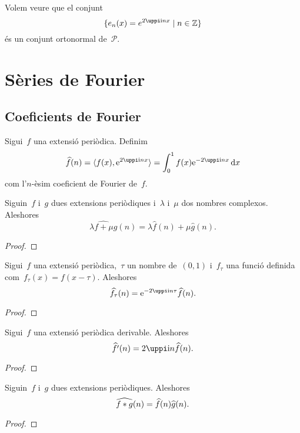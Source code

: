 \documentclass[../../main.tex]{subfiles}
\begin{document}
	\begin{example}
		\label{ex:base ortonormal de les extensions periòdiques}
		Volem veure que el conjunt
		\[
		    \{e_{n}(x)=e^{2\uppi\iu nx}\mid n\in\mathbb{Z}\}
		\]
		és un conjunt ortonormal de~\(\mathcal{P}\).
		\begin{solution}
		\end{solution}
	\end{example}
\section{Sèries de Fourier}
	\subsection{Coeficients de Fourier}
	\begin{definition}
		\label{def:coeficients de Fourier}
		Sigui~\(f\) una extensió periòdica.
		Definim
		\[
		    \widehat{f}(n)=\langle f(x),\e^{2\uppi\iu nx}\rangle=\int_{0}^{1}f(x)\e^{-2\uppi\iu nx}\diff x
		\]
		com l'\(n\)-èsim coeficient de Fourier de~\(f\).
	\end{definition}
	\begin{proposition}
		Siguin~\(f\) i~\(g\) dues extensions periòdiques i~\(\lambda\) i~\(\mu\) dos nombres complexos.
		Aleshores
		\[
		    \widehat{\lambda f+\mu g}(n)=\lambda\widehat{f}(n)+\mu\widehat{g}(n).
		\]
		\begin{proof}
		\end{proof}
	\end{proposition}
	\begin{proposition}
		Sigui~\(f\) una extensió periòdica,~\(\tau\) un nombre de~\((0,1)\) i~\(f_{\tau}\) una funció definida com~\(f_{\tau}(x)=f(x-\tau)\).
		Aleshores
		\[
		    \widehat{f_{\tau}}(n)=\e^{-2\uppi\iu n\tau}\widehat{f}(n).
		\]
		\begin{proof}
		\end{proof}
	\end{proposition}
	\begin{proposition}
		Sigui~\(f\) una extensió periòdica derivable.
		Aleshores
		\[
		    \widehat{f'}(n)=2\uppi\iu n\widehat{f}(n).
		\]
		\begin{proof}
		\end{proof}
	\end{proposition}
	\begin{proposition}
		Siguin~\(f\) i~\(g\) dues extensions periòdiques.
		Aleshores
		\[
		    \widehat{f\mathbin{\ast} g}(n)=\widehat{f}(n)\widehat{g}(n).
		\]
		\begin{proof}
		\end{proof}
	\end{proposition}
\end{document}
